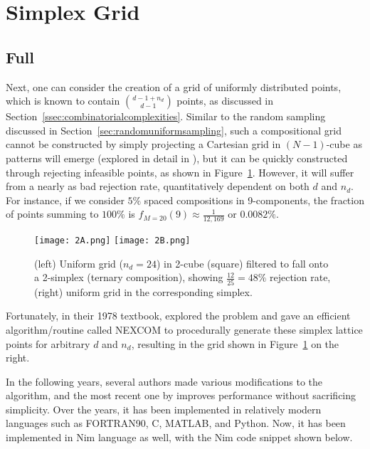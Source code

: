 \section{Simplex Grid} \label{sec:simplexgrid}

\subsection{Full} \label{ssec:fullgrid}

Next, one can consider the creation of a grid of uniformly distributed points, which is known to contain $\binom{d-1+n_d}{d-1}$ points, as discussed in Section~\ref{ssec:combinatorialcomplexities}. Similar to the random sampling discussed in Section~\ref{sec:randomuniformsampling}, such a compositional grid cannot be constructed by simply projecting a Cartesian grid in $(N-1)$-cube as patterns will emerge (explored in detail in \cite{Otis2017AnSystems}), but it can be quickly constructed through rejecting infeasible points, as shown in Figure~\ref{fig:simplexgrid}. However, it will suffer from a nearly as bad rejection rate, quantitatively dependent on both $d$ and $n_d$. For instance, if we consider $5\%$ spaced compositions in 9-components, the fraction of points summing to $100\%$ is $f_{M=20}(9) \approx \frac{1}{12,169}$ or $0.0082\%$. 

\begin{figure}[h]
    \centering
    \hfill
    \texttt{[image: 2A.png]}
    \hfill
    \texttt{[image: 2B.png]}
    \hfill
    \caption{(left) Uniform grid ($n_d=24$) in 2-cube (square) filtered to fall onto a 2-simplex (ternary composition), showing $\frac{12}{25}=48\%$ rejection rate, (right) uniform grid in the corresponding simplex.} 
    \label{fig:simplexgrid}
\end{figure}

Fortunately, in their 1978 textbook, \citet{Nijenhuis1978CombinatorialCalculators} explored the problem and gave an efficient algorithm/routine called NEXCOM to procedurally generate these simplex lattice points for arbitrary $d$ and $n_d$, resulting in the grid shown in Figure~\ref{fig:simplexgrid} on the right.

In the following years, several authors made various modifications to the algorithm, and the most recent one by \citet{Chasalow1995AlgorithmPoints} improves performance without sacrificing simplicity. Over the years, it has been implemented in relatively modern languages such as FORTRAN90, C, MATLAB, and Python. Now, it has been implemented in Nim language as well, with the Nim code snippet shown below.

